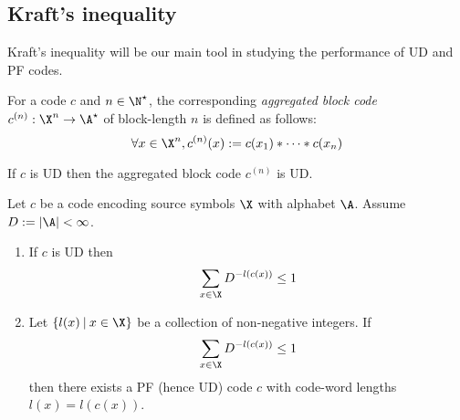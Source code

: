 \documentclass[toc]{../cs-classes/cs-classes}
\begin{document}
\subsection{Kraft's inequality}
Kraft's inequality will be our main tool in studying the performance of UD and PF codes.

\begin{definition}
    For a code $c$ and $n\in \N^\star$, the corresponding \emph{aggregated block code} $c^{(n)} : \X^n\to \A^\star$ of block-length $n$ is defined as follows:
    \begin{equation*}
        \forall x\in \X^n, c^{(n)}(x) := c(x_1) * \dots * c(x_n)
    \end{equation*}
\end{definition}

\begin{lemma}
    If $c$ is UD then the aggregated block code $c^{(n)}$ is UD.
\end{lemma}


\begin{theorem}
    Let $c$ be a code encoding source symbols $\X$ with alphabet $\A$. Assume $D:=|\A|<\infty$. 
    \begin{enumerate}
        \item If $c$ is UD then
        \begin{equation}
            \label{eq:kraft-ineq}
            \sum_{x\in\X} D^{-l(c(x))}\leq 1
        \end{equation}

        \item Let $\{l(x)\:|\:x\in\X\}$ be a collection of non-negative integers. If
        \begin{equation*}
            \sum_{x\in\X} D^{-l(c(x))}\leq 1
        \end{equation*}
        then there exists a PF (hence UD) code $c$ with code-word lengths $l(x)=l(c(x))$.
    \end{enumerate}
\end{theorem}
\end{document}
